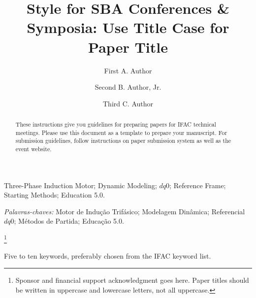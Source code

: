 \documentclass[a4paper]{ifacconf}
\begin{document}
\begin{frontmatter}


\begin{keyword}
Three-Phase Induction Motor; Dynamic Modeling; $dq0$; Reference Frame; Starting Methods; Education 5.0. 

\vskip 1mm%
{\noindent\it Palavras-chaves:} Motor de Indução Trifásico; Modelagem Dinâmica; Referencial $dq0$; Métodos de Partida; Educação 5.0.
\end{keyword}


\end{frontmatter}
\else



\begin{frontmatter}

\title{Style for SBA Conferences \& Symposia: Use Title Case for
  Paper Title} 

\thanks[footnoteinfo]{Sponsor and financial support acknowledgment
goes here. Paper titles should be written in uppercase and lowercase
letters, not all uppercase.}

\author[First]{First A. Author} 
\author[Second]{Second B. Author, Jr.} 
\author[Third]{Third C. Author}


\address[First]{Faculdade de Engenharia Elétrica, Universidade do Triângulo, MG, (e-mail: autor1@faceg@univt.br).}
\address[Second]{Faculdade de Engenharia de Controle \& Automação, Universidade do Futuro, RJ (e-mail: autor2@feca.unifutu.rj)}
\address[Third]{Electrical Engineering Department, 
   Seoul National University, Seoul, Korea, (e-mail: author3@snu.ac.kr)}
   
\renewcommand{\abstractname}{{\bf Abstract:~}}   
   
\begin{abstract}                %
These instructions give you guidelines for preparing papers for IFAC
technical meetings. Please use this document as a template to prepare
your manuscript. For submission guidelines, follow instructions on
paper submission system as well as the event website.
\end{abstract}

\begin{keyword}
Five to ten keywords, preferably chosen from the IFAC keyword list.
\end{keyword}

\end{frontmatter}
\fi
\end{document}
